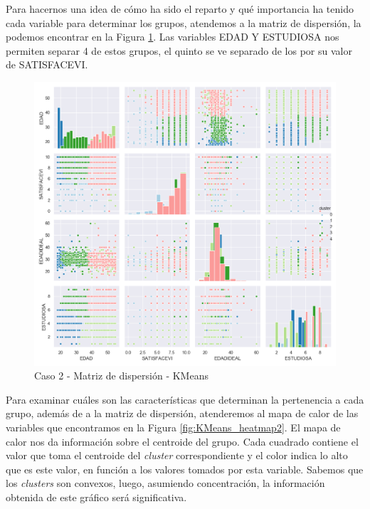 \documentclass[a4paper, 20pt]{article}
\begin{document}
Para hacernos una idea de cómo ha sido el reparto y qué importancia ha tenido cada variable para determinar los grupos, atendemos a la matriz de dispersión, la podemos encontrar en la Figura \ref{fig:KMeans_scattermatrix2}. Las variables EDAD Y ESTUDIOSA nos permiten separar 4 de estos grupos, el quinto se ve separado de los por su valor de SATISFACEVI.

\begin{figure}[H]
    \centering
    \includegraphics[width=1\textwidth]{./caso2/KMeans_scattermatrix}
    \caption{Caso 2 - Matriz de dispersión - KMeans}
    \label{fig:KMeans_scattermatrix2}
\end{figure}

Para examinar cuáles son las características que determinan la pertenencia a cada grupo, además de a la matriz de dispersión, atenderemos al mapa de calor de las variables que encontramos en la Figura \ref{fig:KMeans_heatmap2}. El mapa de calor nos da información sobre el centroide del grupo. Cada cuadrado contiene el valor que toma el centroide del \textit{cluster} correspondiente y el color indica lo alto que es este valor, en función a los valores tomados por esta variable. Sabemos que los \textit{clusters} son convexos, luego, asumiendo concentración, la información obtenida de este gráfico será significativa. 
\end{document}
